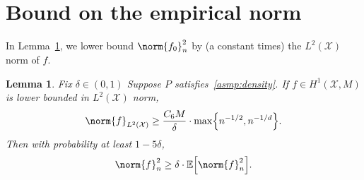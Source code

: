 \documentclass[twoside]{article}
\newcommand{\1}{\mathbf{1}}
\newcommand{\Xset}{\mathcal{X}}
\newcommand{\Leb}{L}
\newcommand{\Ebb}{\mathbb{E}}
\newtheorem{lemma}{Lemma}
\theoremstyle{definition}
\theoremstyle{remark}
\begin{document}
\section{Bound on the empirical norm}
\label{sec:empirical_norm}

In Lemma~\ref{lem:empirical_norm_sobolev}, we lower bound $\norm{f_0}_n^2$ by (a constant times) the $\Leb^2(\Xset)$ norm of $f$.

\begin{lemma}
	\label{lem:empirical_norm_sobolev}
	Fix $\delta \in (0,1)$ Suppose $P$ satisfies~\ref{asmp:density}. If $f \in H^1(\Xset,M)$ is lower bounded in $\Leb^2(\Xset)$ norm,
	\begin{equation}
	\label{eqn:empirical_norm_sobolev_1}
	\norm{f}_{\Leb^2(\Xset)} \geq \frac{C_6 M}{\delta} \cdot \max\Bigl\{n^{-1/2},n^{-1/d}\Bigr\}.
	\end{equation}
	Then with probability at least $1 - 5 \delta$,
	\begin{equation}
	\label{eqn:empirical_norm_sobolev}
	\norm{f}_n^2 \geq \delta \cdot \Ebb\Bigl[\norm{f}_n^2\Bigr].
	\end{equation}
\end{lemma}
\end{document}
